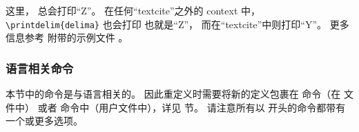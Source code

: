 \begin{ltxexample}[style=latex]{}
\renewcommand*{\delima}{Z}
\end{ltxexample}
%
这里， 总会打印“Z”。
在任何“textcite”之外的 context 中，\verb+\printdelim{delima}+ 也会打印  也就是“Z”，
而在“textcite”中则打印“Y”。
更多信息参考 \biblatex 附带的示例文件 。

\subsubsection{语言相关命令}%
\label{use:fmt:lng}


本节中的命令是与语言相关的。
因此重定义时需要将新的定义包裹在  命令（在  文件中）
或者  命令中（用户文件中），详见  节。
请注意所有以  开头的命令都带有一个或更多选项。

